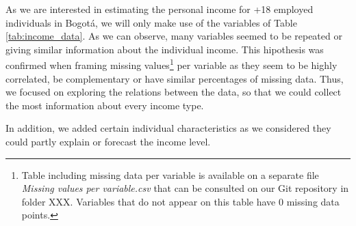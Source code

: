 \documentclass[a4paper,12pt]{article}
\begin{document}
As we are interested in estimating the personal income for +18 employed individuals in Bogotá, we will only make use of the variables of Table \ref{tab:income_data}. As we can observe, many variables seemed to be repeated or giving similar information about the individual income. This hipothesis was confirmed when framing missing values\footnote{Table including missing data per variable is available on a separate file \textit{Missing values per variable.csv} that can be consulted on our Git repository in folder XXX. Variables that do not appear on this table have 0 missing data points.} per variable as they seem to be highly correlated, be complementary or have similar percentages of missing data. Thus, we focused on exploring the relations between the data, so that we could collect the most information about every income type. 

In addition, we added certain individual characteristics as we considered they could partly explain or forecast the income level. 
\end{document}
